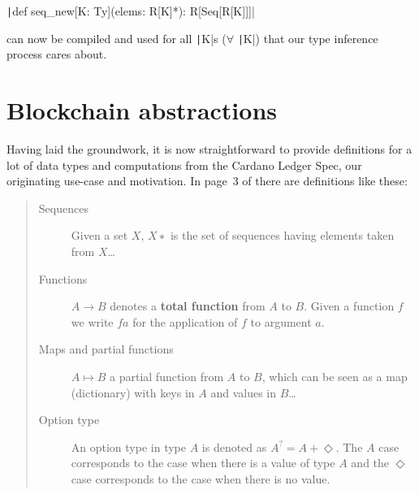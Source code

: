 \documentclass[11pt]{article}
\newcommand{\ScalaI}[1]{\texttt|#1|}
\begin{document}
\ScalaI{def seq_new[K: Ty](elems: R[K]*): R[Seq[R[K]]]}

\noindent can now be compiled and used for all \ScalaI{K}s ($\forall$ \ScalaI{K}) that our type inference process cares about.

\section{Blockchain abstractions}
\label{sec:chain}
Having laid the groundwork, it is now straightforward to provide definitions for a lot of data types and computations from the Cardano Ledger Spec, our originating use-case and motivation. In page~3 of \cite{cardano:ledger-spec:shelley:2019} there are definitions like these:

\begin{quote}
\begin{description}
  \item[Sequences]
  Given a set $X$, $X∗$ is the set of sequences having elements taken from $X$\dots
  
  \item[Functions]
  $A \to B$ denotes a \textbf{total function} from $A$ to $B$. Given a function $f$ we write $f a$ for the application of $f$ to argument $a$.
  
  \item[Maps and partial functions]
  $A \mapsto B$ a partial function from $A$ to $B$, which can be seen as a map (dictionary) with keys in $A$ and values in $B$\dots
  
  \item[Option type]
  An option type in type $A$ is denoted as $A^? = A + \Diamond$. The $A$ case corresponds to
the case when there is a value of type $A$ and the $\Diamond$ case corresponds to the case when there is no value.
\end{description}
\end{quote}
\end{document}
